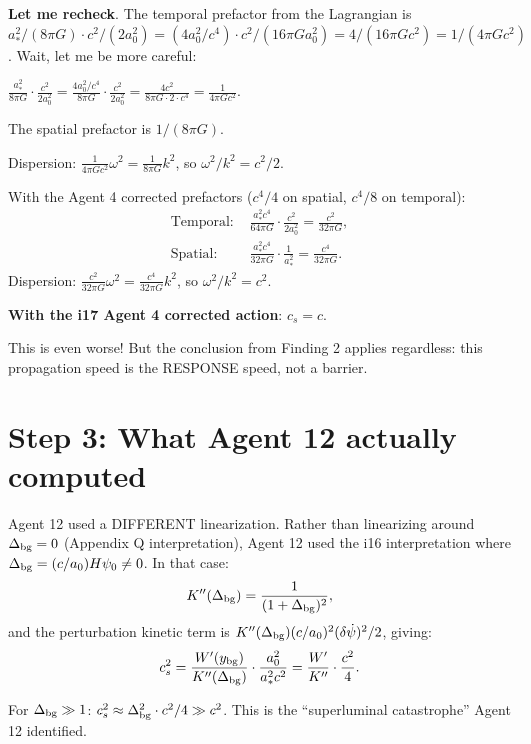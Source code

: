 \documentclass[11pt]{article}
\begin{document}
\textbf{Let me recheck}. The temporal prefactor from the Lagrangian is
$a_*^2/(8\pi G) \cdot c^2/(2a_0^2) = (4a_0^2/c^4) \cdot c^2/(16\pi G a_0^2)
= 4/(16\pi G c^2) = 1/(4\pi G c^2)$. Wait, let me be more careful:

$\frac{a_*^2}{8\pi G} \cdot \frac{c^2}{2a_0^2}
= \frac{4a_0^2/c^4}{8\pi G} \cdot \frac{c^2}{2a_0^2}
= \frac{4c^2}{8\pi G \cdot 2 \cdot c^4}
= \frac{1}{4\pi G c^2}$.

The spatial prefactor is $1/(8\pi G)$.

Dispersion: $\frac{1}{4\pi G c^2}\omega^2 = \frac{1}{8\pi G}k^2$,
so $\omega^2/k^2 = c^2/2$.

With the Agent 4 corrected prefactors ($c^4/4$ on spatial, $c^4/8$ on temporal):
\begin{align}
\text{Temporal: } &\frac{a_*^2 c^4}{64\pi G} \cdot \frac{c^2}{2a_0^2}
= \frac{c^2}{32\pi G}, \\
\text{Spatial: } &\frac{a_*^2 c^4}{32\pi G} \cdot \frac{1}{a_*^2}
= \frac{c^4}{32\pi G}.
\end{align}
Dispersion: $\frac{c^2}{32\pi G}\omega^2 = \frac{c^4}{32\pi G}k^2$,
so $\omega^2/k^2 = c^2$.

\textbf{With the i17 Agent 4 corrected action}: $c_s = c$.

This is even worse! But the conclusion from Finding 2 applies regardless:
this propagation speed is the RESPONSE speed, not a barrier.

\section{Step 3: What Agent 12 actually computed}

Agent 12 used a DIFFERENT linearization. Rather than linearizing around
$\Delta_{\rm bg} = 0$ (Appendix Q interpretation), Agent 12 used the
i16 interpretation where $\Delta_{\rm bg} = (c/a_0)H\psi_0 \neq 0$.
In that case:
\begin{equation}
K''(\Delta_{\rm bg}) = \frac{1}{(1+\Delta_{\rm bg})^2},
\end{equation}
and the perturbation kinetic term is
$K''(\Delta_{\rm bg})(c/a_0)^2(\delta\dot\psi)^2/2$, giving:
\begin{equation}
c_s^2 = \frac{W'(y_{\rm bg})}{K''(\Delta_{\rm bg})} \cdot \frac{a_0^2}{a_*^2 c^2}
= \frac{W'}{K''} \cdot \frac{c^2}{4}.
\end{equation}

For $\Delta_{\rm bg} \gg 1$: $c_s^2 \approx \Delta_{\rm bg}^2 \cdot c^2/4
\gg c^2$. This is the ``superluminal catastrophe'' Agent 12 identified.
\end{document}

